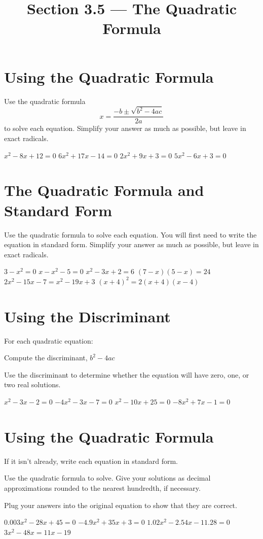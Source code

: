 

\title{Section 3.5 --- The Quadratic Formula}


\maketitle
\section*{Using the Quadratic Formula}
Use the quadratic formula
\[
x=\frac{-b\pm\sqrt{b^2-4ac}}{2a}
\]
to solve each equation.  Simplify your answer as much as possible, but leave in exact radicals.
\begin{smenum}
\mitemxxxx
{$x^2-8x+12=0$}
{$6x^2+17x-14=0$}
{$2x^2+9x+3=0$}
{$5x^2-6x+3=0$}
\end{smenum}

\section*{The Quadratic Formula and Standard Form}
Use the quadratic formula to solve each equation.  You will first need to write the equation in standard form.  Simplify your answer as much as possible, but leave in exact radicals.
\begin{smenum}
\mitemxxxx
{$3-x^2=0$}
{$x-x^2-5=0$}
{$x^2-3x+2=6$}
{$(7-x)(5-x)=24$}
\mitemxx
{$2x^2-15x-7=x^2-19x+3$}
{$(x+4)^2=2(x+4)(x-4)$}
\end{smenum}

\section*{Using the Discriminant}
For each quadratic equation:
\begin{clist}
\item Compute the discriminant, $b^2-4ac$
\item Use the discriminant to determine whether the equation will have zero, one, or two real solutions.
\end{clist}
\begin{smenum}
\mitemxxxx
{$x^2-3x-2=0$}
{$-4x^2-3x-7=0$}
{$x^2-10x+25=0$}
{$-8x^2+7x-1=0$}
\end{smenum}

\section*{Using the Quadratic Formula}
\begin{clist}
\item If it isn't already, write each equation in standard form.
\item Use the quadratic formula to solve.  Give your solutions as decimal approximations rounded to the nearest hundredth, if necessary.
\item Plug your answers into the original equation to show that they are correct.
\end{clist}
\begin{smenum}
\mitemxx
{$0.003x^2-28x+45=0$}
{$-4.9x^2+35x+3=0$}
\mitemxx
{$1.02x^2-2.54x-11.28=0$}
{$3x^2-48x=11x-19$}
\end{smenum}

